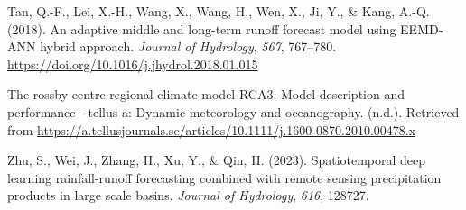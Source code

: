 \documentclass[
]{agujournal2019}
\newlength{\cslhangindent}
\newenvironment{CSLReferences}[2] %
 {\begin{list}{}{%
  \setlength{\itemindent}{0pt}
  \setlength{\leftmargin}{0pt}
  \setlength{\parsep}{0pt}
  \ifodd #1
   \setlength{\leftmargin}{\cslhangindent}
   \setlength{\itemindent}{-1\cslhangindent}
  \fi
  \setlength{\itemsep}{#2\baselineskip}}}
 {\end{list}}
\begin{document}
\begin{CSLReferences}{1}{0}
Tan, Q.-F., Lei, X.-H., Wang, X., Wang, H., Wen, X., Ji, Y., \& Kang,
A.-Q. (2018). An adaptive middle and long-term runoff forecast model
using {EEMD-ANN} hybrid approach. \emph{Journal of Hydrology},
\emph{567}, 767--780.
\url{https://doi.org/10.1016/j.jhydrol.2018.01.015}

The rossby centre regional climate model RCA3: Model description and
performance - tellus a: Dynamic meteorology and oceanography. (n.d.).
Retrieved from
\url{https://a.tellusjournals.se/articles/10.1111/j.1600-0870.2010.00478.x}

Zhu, S., Wei, J., Zhang, H., Xu, Y., \& Qin, H. (2023). Spatiotemporal
deep learning rainfall-runoff forecasting combined with remote sensing
precipitation products in large scale basins. \emph{Journal of
Hydrology}, \emph{616}, 128727.

\end{CSLReferences}
\end{document}
